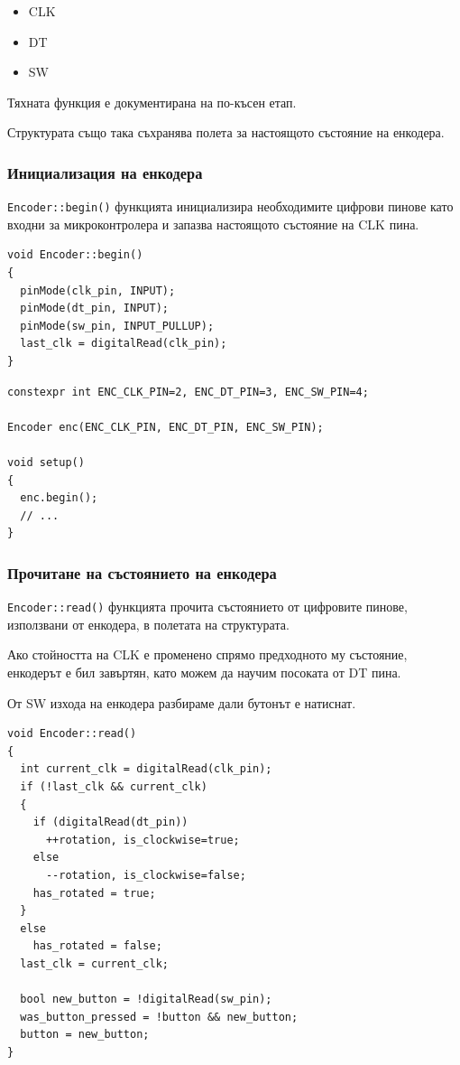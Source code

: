 \documentclass[titlepage, oneside, 12pt]{book}
\begin{document}
\begin{itemize}
    \item CLK
    \item DT
    \item SW
\end{itemize}

Тяхната функция е документирана на по-късен етап. %

Структурата също така съхранява полета за настоящото състояние на енкодера.


\subsubsection{Инициализация на енкодера}

\texttt{Encoder::begin()} функцията инициализира необходимите цифрови пинове като
входни за микроконтролера и запазва настоящото състояние на CLK пина.

\begin{verbatim}
void Encoder::begin()
{
  pinMode(clk_pin, INPUT);
  pinMode(dt_pin, INPUT);
  pinMode(sw_pin, INPUT_PULLUP);
  last_clk = digitalRead(clk_pin); 
}
\end{verbatim}

\begin{verbatim}
constexpr int ENC_CLK_PIN=2, ENC_DT_PIN=3, ENC_SW_PIN=4;

Encoder enc(ENC_CLK_PIN, ENC_DT_PIN, ENC_SW_PIN);

void setup()
{
  enc.begin();
  // ...
}
\end{verbatim}

\subsubsection{Прочитане на състоянието на енкодера}

\texttt{Encoder::read()} функцията прочита състоянието от цифровите пинове, използвани от енкодера, в полетата на структурата.

Ако стойността на CLK е променено спрямо предходното му състояние, енкодерът е бил завъртян, като можем да научим
посоката от DT пина.

От SW изхода на енкодера разбираме дали бутонът е натиснат.

\begin{verbatim}
void Encoder::read()
{
  int current_clk = digitalRead(clk_pin);
  if (!last_clk && current_clk)
  {
    if (digitalRead(dt_pin))
      ++rotation, is_clockwise=true;
    else
      --rotation, is_clockwise=false;
    has_rotated = true;
  }
  else
    has_rotated = false;
  last_clk = current_clk;

  bool new_button = !digitalRead(sw_pin);
  was_button_pressed = !button && new_button;
  button = new_button;
}
\end{verbatim}
\end{document}
